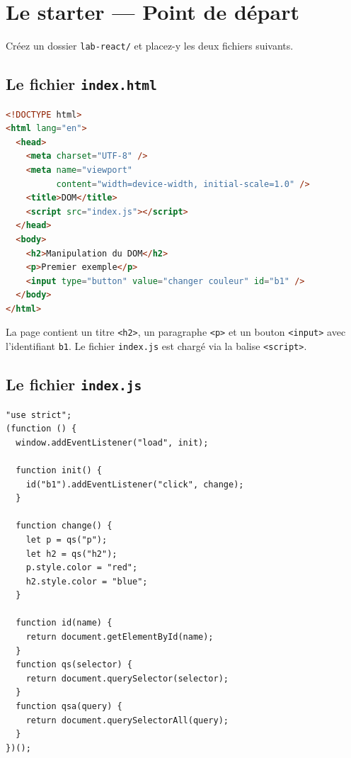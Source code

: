 \documentclass[11pt,a4paper]{article}
\begin{document}
\tableofcontents

\newpage

\section{Le starter --- Point de départ}
\label{sec:starter}

Créez un dossier \texttt{lab-react/} et placez-y les deux fichiers suivants.

\subsection{Le fichier \texttt{index.html}}

\begin{lstlisting}[language=HTML]
<!DOCTYPE html>
<html lang="en">
  <head>
    <meta charset="UTF-8" />
    <meta name="viewport"
          content="width=device-width, initial-scale=1.0" />
    <title>DOM</title>
    <script src="index.js"></script>
  </head>
  <body>
    <h2>Manipulation du DOM</h2>
    <p>Premier exemple</p>
    <input type="button" value="changer couleur" id="b1" />
  </body>
</html>
\end{lstlisting}

La page contient un titre \texttt{<h2>}, un paragraphe \texttt{<p>} et un bouton \texttt{<input>} avec l'identifiant \texttt{b1}. Le fichier \texttt{index.js} est chargé via la balise \texttt{<script>}.

\subsection{Le fichier \texttt{index.js}}

\begin{lstlisting}
"use strict";
(function () {
  window.addEventListener("load", init);

  function init() {
    id("b1").addEventListener("click", change);
  }

  function change() {
    let p = qs("p");
    let h2 = qs("h2");
    p.style.color = "red";
    h2.style.color = "blue";
  }

  function id(name) {
    return document.getElementById(name);
  }
  function qs(selector) {
    return document.querySelector(selector);
  }
  function qsa(query) {
    return document.querySelectorAll(query);
  }
})();
\end{lstlisting}
\end{document}
